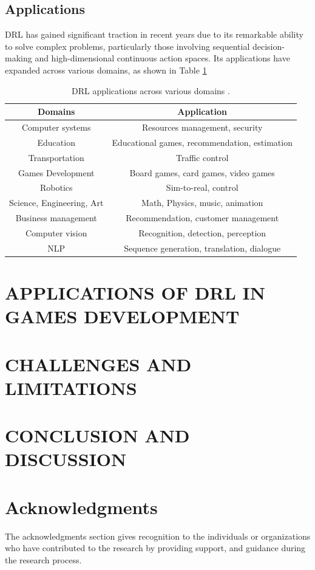\documentclass{article}
\begin{document}
\subsection{Applications}
DRL has gained significant traction in recent years due to its remarkable ability to solve complex problems, particularly those involving sequential decision-making and high-dimensional continuous action spaces. Its applications have expanded across various domains, as shown in Table \ref{tab: DRL applications across various domains.} 


\begin{table}
\centering
\begin{tabular}{|c|c|} \hline
    \textbf{Domains}& \textbf{Application}\\ \hline 
         Computer systems& Resources management, security\\ \hline 
         Education& Educational games, recommendation, estimation\\ \hline 
         Transportation&Traffic control\\ \hline 
         Games Development& Board games, card games, video games\\ \hline 
         Robotics& Sim-to-real, control\\ \hline 
         Science, Engineering, Art& Math, Physics, music, animation\\ \hline 
         Business management& Recommendation, customer management\\ \hline 
         Computer vision& Recognition, detection, perception\\ \hline 
         NLP& Sequence generation, translation, dialogue\\\hline
    \end{tabular}
    \caption{DRL applications across various domains \cite{li2017deep}.}
    \label{tab: DRL applications across various domains.}
\end{table}

\section{APPLICATIONS OF DRL IN GAMES DEVELOPMENT}


\section{CHALLENGES AND LIMITATIONS}
\section{CONCLUSION AND DISCUSSION}
\section{Acknowledgments}
The acknowledgments section gives recognition to the individuals or organizations who have contributed to the research by providing support, and guidance during the research process.
\newpage


\end{document}
